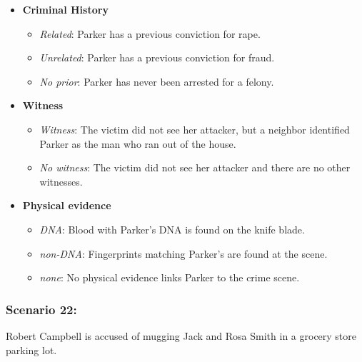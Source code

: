 \documentclass[
]{article}
\providecommand{\tightlist}{%
  \setlength{\itemsep}{0pt}\setlength{\parskip}{0pt}}
\begin{document}
\begin{itemize}
\tightlist
\item
  \textbf{Criminal History}

  \begin{itemize}
  \tightlist
  \item
    \emph{Related}: Parker has a previous conviction for rape.
  \item
    \emph{Unrelated}: Parker has a previous conviction for fraud.
  \item
    \emph{No prior}: Parker has never been arrested for a felony.
  \end{itemize}
\item
  \textbf{Witness}

  \begin{itemize}
  \tightlist
  \item
    \emph{Witness}: The victim did not see her attacker, but a neighbor
    identified Parker as the man who ran out of the house.
  \item
    \emph{No witness}: The victim did not see her attacker and there are
    no other witnesses.
  \end{itemize}
\item
  \textbf{Physical evidence}

  \begin{itemize}
  \tightlist
  \item
    \emph{DNA}: Blood with Parker's DNA is found on the knife blade.
  \item
    \emph{non-DNA}: Fingerprints matching Parker's are found at the
    scene.
  \item
    \emph{none}: No physical evidence links Parker to the crime scene.
  \end{itemize}
\end{itemize}

\hypertarget{scenario-22}{%
\subsubsection{Scenario 22:}\label{scenario-22}}

Robert Campbell is accused of mugging Jack and Rosa Smith in a grocery
store parking lot.
\end{document}
